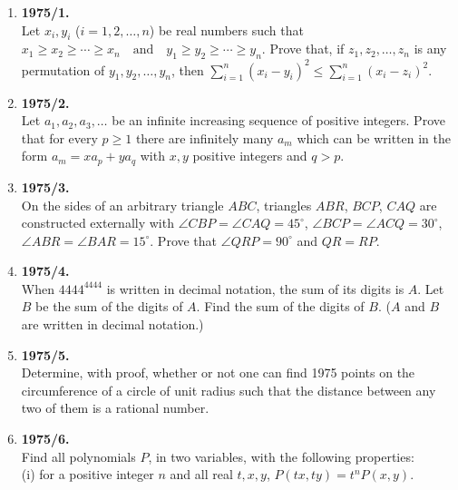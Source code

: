 \documentclass{article}
\begin{document}
\begin{enumerate}
\item\textbf{1975/1.} \\
Let $x_i, y_i$ ($i = 1, 2, \ldots, n$) be real numbers such that
$
x_1 \ge x_2 \ge \cdots \ge x_n \quad \text{and} \quad y_1 \ge y_2 \ge \cdots \ge y_n.
$
Prove that, if $z_1, z_2, \ldots, z_n$ is any permutation of $y_1, y_2, \ldots, y_n$, then
$
\sum_{i=1}^{n} (x_i - y_i)^2 \le \sum_{i=1}^{n} (x_i - z_i)^2.
$

\bigskip

\item\textbf{1975/2.} \\
Let $a_1, a_2, a_3, \ldots$ be an infinite increasing sequence of positive integers. Prove that for every $p \ge 1$ there are infinitely many $a_m$ which can be written in the form
$
a_m = x a_p + y a_q
$
with $x, y$ positive integers and $q > p$.

\bigskip

\item\textbf{1975/3.} \\
On the sides of an arbitrary triangle $ABC$, triangles $ABR$, $BCP$, $CAQ$ are constructed externally with $\angle CBP = \angle CAQ = 45^\circ$, $\angle BCP = \angle ACQ = 30^\circ$, $\angle ABR = \angle BAR = 15^\circ$. Prove that $\angle QRP = 90^\circ$ and $QR = RP$.

\bigskip

\item\textbf{1975/4.} \\
When $4444^{4444}$ is written in decimal notation, the sum of its digits is $A$. Let $B$ be the sum of the digits of $A$. Find the sum of the digits of $B$. ($A$ and $B$ are written in decimal notation.)

\bigskip

\item\textbf{1975/5.} \\
Determine, with proof, whether or not one can find 1975 points on the circumference of a circle of unit radius such that the distance between any two of them is a rational number.

\bigskip

\item\textbf{1975/6.} \\
Find all polynomials $P$, in two variables, with the following properties: \\
(i) for a positive integer $n$ and all real $t, x, y$,
$
P(tx, ty) = t^n P(x, y).
$
\end{enumerate}
\end{document}
